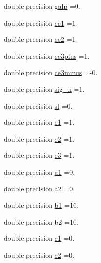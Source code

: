 \begin{DoxyCompactItemize}
\item 
double precision \mbox{\hyperlink{structmodulegotm_1_1t__gotmparameters_ad301b820dc5d6c8ba6a03e98e2f2f72f}{galp}} =0.
\item 
double precision \mbox{\hyperlink{structmodulegotm_1_1t__gotmparameters_aa71477d40dde4ee68e61000b15149e0b}{ce1}} =1.
\item 
double precision \mbox{\hyperlink{structmodulegotm_1_1t__gotmparameters_ab97a9aa7d960153e761e1d5d5f7a18ed}{ce2}} =1.
\item 
double precision \mbox{\hyperlink{structmodulegotm_1_1t__gotmparameters_a0d9ac20abc877e7bae738ab1c606327d}{ce3plus}} =1.
\item 
double precision \mbox{\hyperlink{structmodulegotm_1_1t__gotmparameters_acde5ba236025bd08fb11be0b5316850e}{ce3minus}} =-\/0.
\item 
double precision \mbox{\hyperlink{structmodulegotm_1_1t__gotmparameters_a6558e32ef76143c6e0d7263eef78dde8}{sig\+\_\+k}} =1.
\item 
double precision \mbox{\hyperlink{structmodulegotm_1_1t__gotmparameters_af30324fdfee8184bb4980e6e0cd5a3f3}{sl}} =0.
\item 
double precision \mbox{\hyperlink{structmodulegotm_1_1t__gotmparameters_ac1f27713fa8035f837a58b558f10d6c4}{e1}} =1.
\item 
double precision \mbox{\hyperlink{structmodulegotm_1_1t__gotmparameters_a05753420128552fb05e707ce805d2228}{e2}} =1.
\item 
double precision \mbox{\hyperlink{structmodulegotm_1_1t__gotmparameters_a92ee11576fa2957750127c6ff648d244}{e3}} =1.
\item 
double precision \mbox{\hyperlink{structmodulegotm_1_1t__gotmparameters_a6869ca7477599a18cf432297ee04d5c6}{a1}} =0.
\item 
double precision \mbox{\hyperlink{structmodulegotm_1_1t__gotmparameters_a3c59fd981ba42a5e030a4525dded44f7}{a2}} =0.
\item 
double precision \mbox{\hyperlink{structmodulegotm_1_1t__gotmparameters_ab31f8f442fe1cc19e0f6fcb668bca4c6}{b1}} =16.
\item 
double precision \mbox{\hyperlink{structmodulegotm_1_1t__gotmparameters_a1f0b7d3dad1e59ae8add3706b3606cbb}{b2}} =10.
\item 
double precision \mbox{\hyperlink{structmodulegotm_1_1t__gotmparameters_ab843e54a1c0979706ea8d856229cbebf}{c1}} =0.
\item 
double precision \mbox{\hyperlink{structmodulegotm_1_1t__gotmparameters_ad9e7d8511ed58d01c29e7cba493361f3}{c2}} =0.

\end{DoxyCompactItemize}

